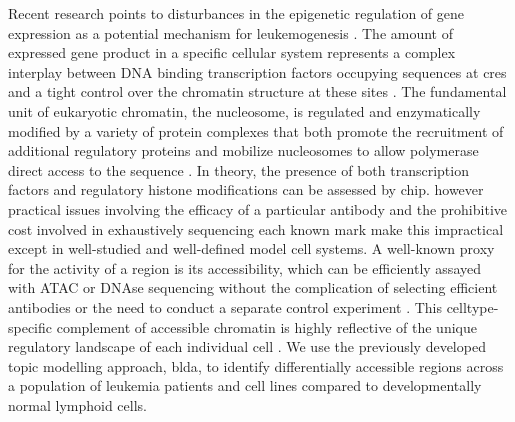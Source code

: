 
Recent research points to disturbances in the epigenetic regulation of gene expression as a potential mechanism for leukemogenesis \cite{Krivtsov2007}. The amount of expressed gene product in a specific cellular system represents a complex interplay between DNA binding transcription factors occupying sequences at \glspl{cre} and a tight control over the chromatin structure at these sites \cite{Cierpicki2010}. The fundamental unit of eukaryotic chromatin, the nucleosome, is regulated and enzymatically modified by a variety of protein complexes that both promote the recruitment of additional regulatory proteins and mobilize nucleosomes to allow polymerase direct access to the sequence \cite{Klemm2019a,Hu2016}. In theory, the presence of both transcription factors and regulatory histone modifications can be assessed by \gls{chip}. however practical issues involving the efficacy of a particular antibody and the prohibitive cost involved in exhaustively sequencing each known mark make this impractical except in well-studied and well-defined model cell systems. A well-known proxy for the activity of a region is its accessibility, which can be efficiently assayed with ATAC or DNAse sequencing without the complication of selecting efficient antibodies or the need to conduct a separate control experiment \cite{Song2011,Minnoye2021,Thurman2012,Boyle2008}. This celltype-specific complement of accessible chromatin is highly reflective of the unique regulatory landscape of each individual cell \cite{Thurman2012,Zhang2021,Schulz2019}. We use the previously developed topic modelling approach, \gls{blda}, to identify differentially accessible regions across a population of leukemia patients and cell lines compared to developmentally normal lymphoid cells. 

